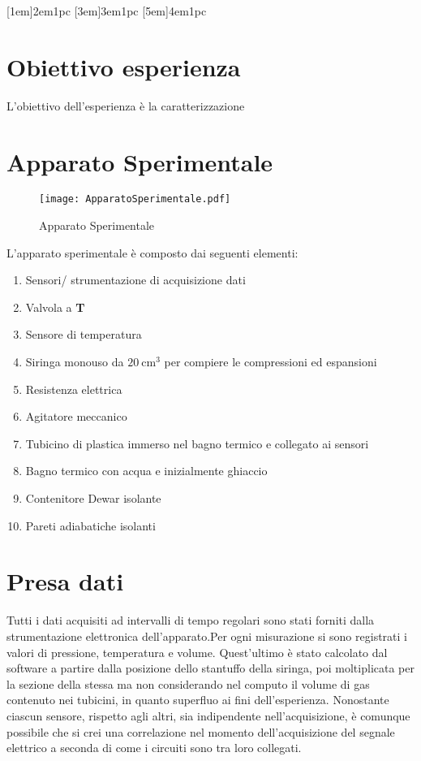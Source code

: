 \documentclass[a4paper,11pt,oneside]{article}
\begin{document}

\clearpage
\tableofcontents
{}
\contentsmargin{6em}
[1em]{\bigskip}{2em}{1pc}
[3em]{\smallskip}{3em}{1pc}
[5em]{\smallskip}{4em}{1pc}


\newpage


\section{Obiettivo esperienza}
L'obiettivo dell'esperienza è la caratterizzazione

\section{Apparato Sperimentale}
\begin{figure}[h!]
    \centering
    \texttt{[image: ApparatoSperimentale.pdf]}
    \caption{Apparato Sperimentale}
    \label{fig:apparato_sperimentale}
\end{figure}

L'apparato sperimentale è composto dai seguenti elementi: 
\begin{enumerate}[label=\textbf{\alph*.}]
    \item Sensori/ strumentazione di acquisizione dati
    \item Valvola a \textbf{T}
    \item Sensore di temperatura
    \item Siringa monouso da $\SI{20}{\centi\meter\cubed}$ per compiere le compressioni ed espansioni
    \item Resistenza elettrica
    \item Agitatore meccanico
    \item Tubicino di plastica immerso nel bagno termico e collegato ai sensori
    \item Bagno termico con acqua e inizialmente ghiaccio
    \item Contenitore Dewar isolante
    \item Pareti adiabatiche isolanti
\end{enumerate}

\section{Presa dati}
Tutti i dati acquisiti ad intervalli di tempo regolari sono stati forniti dalla strumentazione elettronica dell'apparato.Per ogni misurazione si sono registrati i valori di pressione, temperatura e volume. Quest'ultimo è stato calcolato dal software a partire dalla posizione dello stantuffo della siringa, poi moltiplicata per la sezione della stessa ma non considerando nel computo il volume di gas contenuto nei tubicini, in quanto superfluo ai fini dell'esperienza. Nonostante ciascun sensore, rispetto agli altri, sia indipendente nell'acquisizione, è comunque possibile che si crei una correlazione nel momento dell'acquisizione del segnale elettrico a seconda di come i circuiti sono tra loro collegati.\newline
\end{document}
